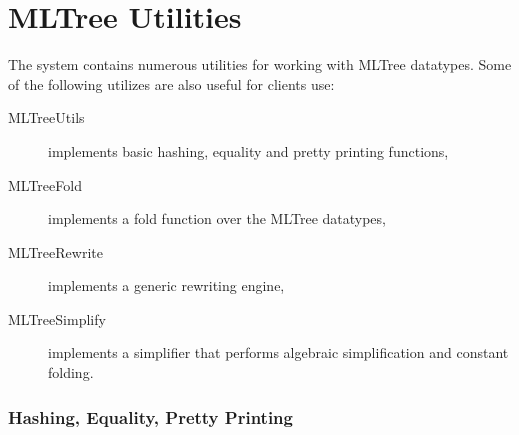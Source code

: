 \section{MLTree Utilities} 

The \MLRISC{} system contains numerous utilities for working with
MLTree datatypes.  Some of the following utilizes are also useful for clients
use:
\begin{description}
  \item[MLTreeUtils] implements basic hashing, equality and pretty
printing functions,
  \item[MLTreeFold] implements a fold function over the MLTree datatypes,  
  \item[MLTreeRewrite] implements a generic rewriting engine,
  \item[MLTreeSimplify] implements a simplifier that performs algebraic
simplification and constant folding.
\end{description}
\subsubsection{Hashing, Equality, Pretty Printing}

